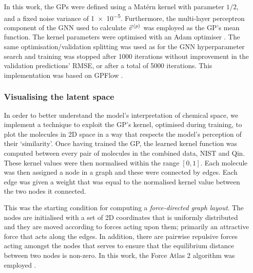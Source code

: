 In this work, the GPs  were defined using a Mat\'ern kernel with parameter $1/2$, and a fixed noise variance of \num{1e-5}. Furthermore, the multi-layer perceptron component of the GNN used to calculate $\vec{v}^{\,(p)}{}$ was employed as the GP's mean function.
The kernel parameters were optimised with an Adam optimiser \cite{kingmaAdamMethodStochastic2017a}.
The same optimisation/validation splitting was used as for the GNN hyperparameter search and training was stopped after \num{1000} iterations without improvement in the validation predictions' RMSE, or after a total of \num{5000} iterations. This implementation was based on GPFlow \cite{matthewsGPflowGaussianProcess2017}.

\subsubsection{Visualising the latent space}

In order to better understand the model's interpretation of chemical space, we
implement a technique to exploit the GP's kernel, optimised during training, to
plot the molecules in 2D space in a way that respects the model's perception of
their `similarity'. Once having trained the GP, the learned kernel function was
computed between every pair of molecules in the combined data, NIST and Qin.
These kernel values were then normalised within the range $[0, 1]$. Each
molecule was then assigned a node in a graph and these were connected by edges.
Each edge was given a weight that was equal to the normalised kernel value
between the two nodes it connected.

This was the starting condition for computing a \emph{force-directed graph
    layout}. The nodes are initialised with a set of 2D coordinates that is
uniformly distributed and they are moved according to forces acting upon them;
primarily an attractive force that acts along the edges. In addition, there are
pairwise repulsive forces acting amongst the nodes that serves to ensure that
the equilibrium distance between two nodes is non-zero. In this work, the Force
Atlas 2 algorithm was employed
\cite{jacomyForceAtlas2ContinuousGraph2014,bastianGephiOpenSource2009}.